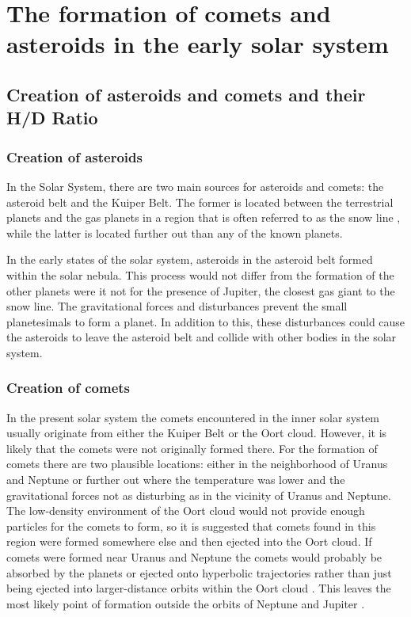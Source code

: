 \section{\label{chap:formation}The formation of comets and asteroids in the early solar system}
\subsection{Creation of asteroids and comets and their H/D Ratio}
\subsubsection{Creation of asteroids}
In the Solar System, there are two main sources for asteroids and comets: the asteroid belt and the Kuiper Belt. The former is located between the terrestrial planets and the gas planets in a region that is often referred to as the snow line \cite{asteroid_belts}, while the latter is located further out than any of the known planets.

In the early states of the solar system, asteroids in the asteroid belt formed within the solar nebula. This process would not differ from the formation of the other planets were it not for the presence of Jupiter, the closest gas giant to the snow line. The gravitational forces and disturbances prevent the small planetesimals to form a planet. In addition to this, these disturbances could cause the asteroids to leave the asteroid belt and collide with other bodies in the solar system. \cite{asteroid_belts}

\subsubsection{Creation of comets}
In the present solar system the comets encountered in the inner solar system usually originate from either the Kuiper Belt or the Oort cloud. However, it is likely that the comets were not originally formed there.
For the formation of comets there are two plausible locations: either in the neighborhood of Uranus and Neptune or further out where the temperature was lower and the gravitational forces not as disturbing as in the vicinity of Uranus and Neptune. The low-density environment of the Oort cloud would not provide enough particles for the comets to form, so it is suggested that comets found in this region were formed somewhere else and then ejected into the Oort cloud.
If comets were formed near Uranus and Neptune the comets would probably be absorbed by the planets or ejected onto hyperbolic trajectories rather than just being ejected into larger-distance orbits within the Oort cloud \cite{comets_radiation_pressure}. This leaves the most likely point of formation outside the orbits of Neptune and Jupiter \cite{comets_origin}.


